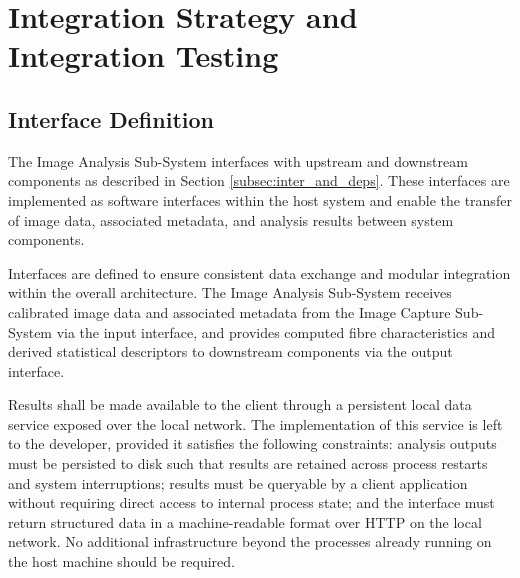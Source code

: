 \documentclass[11pt,a4paper]{article}
\begin{document}
\section{Integration Strategy and Integration Testing}

\subsection{Interface Definition}

The Image Analysis Sub-System interfaces with upstream and downstream
components as described in Section \ref{subsec:inter_and_deps}. These
interfaces are implemented as software interfaces within the host system
and enable the transfer of image data, associated metadata, and analysis
results between system components.

Interfaces are defined to ensure consistent data exchange and modular
integration within the overall architecture. The Image Analysis Sub-System
receives calibrated image data and associated metadata from the Image
Capture Sub-System via the input interface, and provides computed fibre
characteristics and derived statistical descriptors to downstream components
via the output interface.

Results shall be made available to the client through a persistent local
data service exposed over the local network. The implementation of this
service is left to the developer, provided it satisfies the following
constraints: analysis outputs must be persisted to disk such that results
are retained across process restarts and system interruptions; results must
be queryable by a client application without requiring direct access to
internal process state; and the interface must return structured data in a
machine-readable format over HTTP on the local network. No additional
infrastructure beyond the processes already running on the host machine
should be required.
\end{document}

